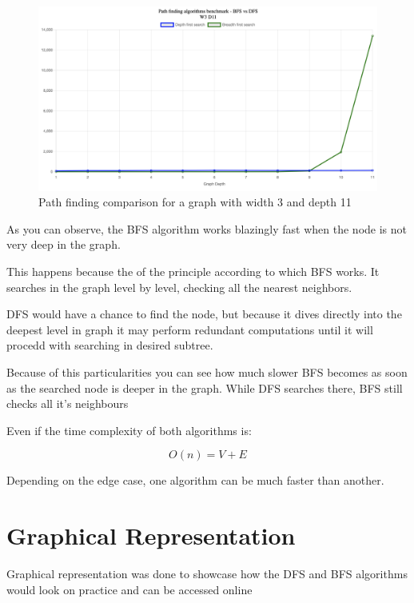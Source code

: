 \documentclass[12pt]{article}
\begin{document}
\begin{figure}[h]
    \centering
    \includegraphics[width=1\textwidth]{images/w3d11.png}
    \caption{Path finding comparison for a graph with width 3 and depth 11}
    \label{fig:w3d11}
\end{figure}

\clearpage

As you can observe, the BFS algorithm works blazingly fast when the node is not very deep in the graph.

This happens because the of the principle according to which BFS works. 
It searches in the graph level by level, checking all the nearest neighbors.

DFS would have a chance to find the node, but because it dives directly into the deepest level
in graph it may perform redundant computations until it will procedd with searching in desired subtree.

Because of this particularities you can see how much slower BFS becomes as soon as the searched node 
is deeper in the graph. While DFS searches there, BFS still checks all it's neighbours

Even if the time complexity of both algorithms is:

$$O(n) = V + E$$

Depending on the edge case, one algorithm can be much faster than another.

\section*{Graphical Representation}
\hspace{0.8cm}
Graphical representation was done to showcase how the DFS and BFS algorithms would look on practice
and can be accessed online\cite{site}
\end{document}
